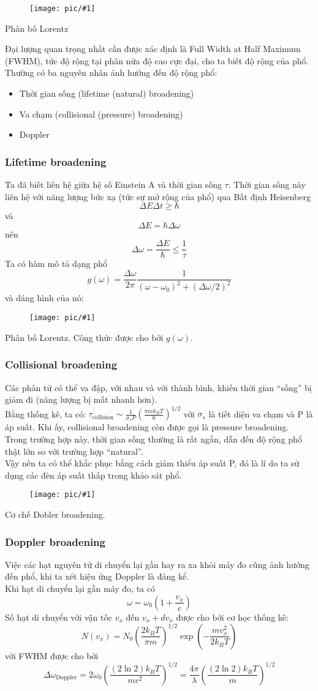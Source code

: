 \documentclass{report}
\newcommand{\image}[1]{
\begin{figure}[H]
	\centering
	\texttt{[image: pic/\#1]}
	\label{#1}
\end{figure}
}
\begin{document}
\image{cauchy.png}{Phân bố Lorentz}

Đại lượng quan trọng nhất cần được xác định là Full Width at Half Maximum (FWHM), tức độ rộng tại phân nửa độ cao cực đại, cho ta biết độ rộng của phổ.\\
Thường có ba nguyên nhân ảnh hưởng đến độ rộng phổ:
\begin{itemize}
	\item Thời gian sống (lifetime (natural) broadening)
	\item Va chạm (collisional (pressure) broadening)
	\item Doppler
\end{itemize}
\subsubsection{Lifetime broadening}
Ta đã biết liên hệ giữa hệ số Einstein A và thời gian sống $\tau$. Thời gian sống này liên hệ với năng lượng bức xạ (tức sự mở rộng của phổ) qua Bất định Heisenberg $$\Delta E\Delta t \geq \hbar$$
và $$\Delta E = \hbar\Delta\omega$$
nên $$\Delta \omega=\frac{\Delta E}{\hbar} \leq \frac{1}{\tau}$$
Ta có hàm mô tả dạng phổ $$g(\omega) = \frac{\Delta\omega}{2\pi} \frac{1}{(\omega - \omega_0)^2 + (\Delta\omega/2)^2}$$
và dáng hình của nó:
\image{g(w).png}{Phân bố Lorentz. Công thức được cho bởi $g(\omega)$.}
\subsubsection{Collisional broadening}
Các phân tử có thể va đập, với nhau và với thành bình, khiến thời gian ``sống'' bị giảm đi (năng lượng bị mất nhanh hơn).\\
Bằng thống kê, ta có: $\tau_{\text{collision}} \sim \frac{1}{\sigma_s P} \left( \frac{\pi m k_B T}{8} \right)^{1/2}$ với $\sigma_s$ là tiết diện va chạm và P là áp suất. Khi ấy, collisional broadening còn được gọi là pressure broadening.\\
Trong trường hợp này, thời gian sống thường là rất ngắn, dẫn đến độ rộng phổ thật lớn so với trường hợp ``natural''.\\
Vậy nên ta có thể khắc phục bằng cách giảm thiểu áp suất P, đó là lí do ta sử dụng các đèn áp suất thấp trong khảo sát phổ.\\
\image{pbroad.png}{Cơ chế Dobler broadening.}
\subsubsection{Doppler broadening}
Việc các hạt nguyên tử di chuyển lại gần hay ra xa khỏi máy đo cũng ảnh hưởng đến phổ, khi ta xét hiệu ứng Doppler là đáng kể. \\
Khi hạt di chuyển lại gần máy đo, ta có $$\omega=\omega_0\left(1+\frac{v_x}{c}\right)$$
Số hạt di chuyển với vận tốc $v_x$ đến $v_x+dv_x$ được cho bởi cơ học thống kê: $$N(v_x) = N_0 \left( \frac{2k_B T}{\pi m} \right)^{1/2} \exp \left( -\frac{m v_x^2}{2k_B T} \right)$$ với FWHM được cho bởi $$\Delta \omega_{\text{Doppler}} = 2 \omega_0 \left( \frac{(2 \ln 2) k_B T}{mc^2} \right)^{1/2} = \frac{4 \pi}{\lambda} \left( \frac{(2 \ln 2) k_B T}{m} \right)^{1/2}$$
\end{document}
